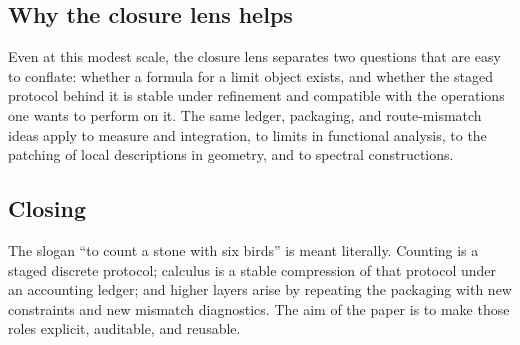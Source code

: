 \subsection{Why the closure lens helps}
Even at this modest scale, the closure lens separates two questions that are easy to conflate: whether a formula for a limit object exists, and whether the staged protocol behind it is stable under refinement and compatible with the operations one wants to perform on it.
The same ledger, packaging, and route-mismatch ideas apply to measure and integration, to limits in functional analysis, to the patching of local descriptions in geometry, and to spectral constructions.

\subsection{Closing}
The slogan ``to count a stone with six birds'' is meant literally.
Counting is a staged discrete protocol; calculus is a stable compression of that protocol under an accounting ledger; and higher layers arise by repeating the packaging with new constraints and new mismatch diagnostics.
The aim of the paper is to make those roles explicit, auditable, and reusable.
